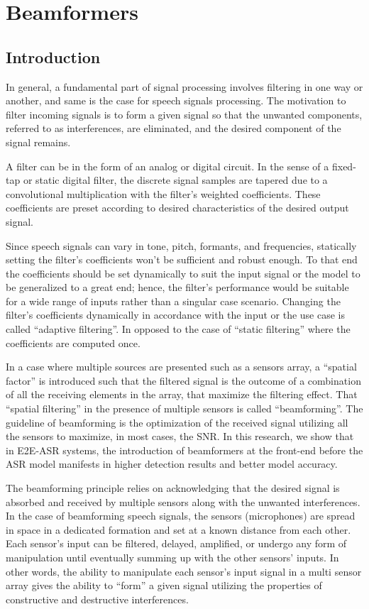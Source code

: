 \chapter{Beamformers}\label{ch:beamformers}
\section{Introduction}
In general, a fundamental part of signal processing 
involves filtering in one way or another,
and same is the case for speech signals processing.
The motivation to filter incoming signals 
is to form a given signal so that the unwanted components, 
referred to as interferences, are eliminated,
and the desired component of the signal remains.

A filter can be in the form of an analog or digital circuit. 
In the sense of a fixed-tap or static digital filter, 
the discrete signal samples are tapered 
due to a convolutional multiplication with 
the filter's weighted coefficients.
These coefficients are preset according 
to desired characteristics of the desired output signal.

Since speech signals can vary in tone, pitch, 
formants, and frequencies, statically setting the filter's 
coefficients won't be sufficient 
and robust enough.
To that end the coefficients should be set dynamically
to suit the input signal or the model to be generalized 
to a great end; hence, the filter's performance 
would be suitable for a wide range of inputs rather than
a singular case scenario.
Changing the filter's coefficients dynamically in accordance
with the input or the use case is called ``adaptive filtering''.
In opposed to the case of ``static filtering'' where 
the coefficients are computed once. 

In a case where multiple sources are presented such
as a sensors array, a ``spatial factor'' is introduced
such that the filtered signal is the outcome of
a combination of all the receiving elements
in the array, that maximize the filtering effect.
That ``spatial filtering'' in the presence of
multiple sensors is called ``beamforming''.
The guideline of beamforming is the optimization of
the received signal utilizing all the sensors
to maximize, in most cases, the SNR.
In this research, we show that in E2E-ASR systems,
the introduction of beamformers at the front-end before
the ASR model manifests in higher detection results
and better model accuracy.

The beamforming principle relies on 
acknowledging that the desired signal 
is absorbed and received by multiple sensors 
along with the unwanted interferences. 
In the case of beamforming speech signals, 
the sensors (microphones) are spread in space in 
a dedicated formation and set at a 
known distance from each other.
Each sensor's input can be filtered, delayed, amplified, 
or undergo any form of manipulation 
until eventually summing up with the other sensors' inputs.
In other words, the ability to manipulate each sensor's 
input signal in a multi sensor array gives the ability
to ``form'' a given signal
utilizing the properties of constructive and destructive
interferences. 

